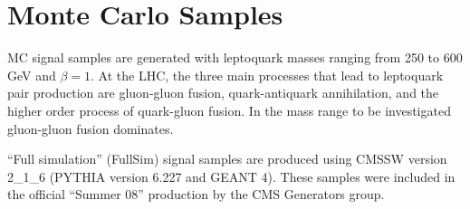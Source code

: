 
%

\section{Monte Carlo Samples} \label{sec:MCSamples}



MC signal samples are generated with leptoquark masses ranging from 250 to 600 GeV and $\beta=1$. 
At the LHC, the three main processes that lead to leptoquark pair production are gluon-gluon fusion, 
quark-antiquark annihilation, and the higher order process of quark-gluon fusion.
In the mass range to be investigated gluon-gluon fusion dominates. 

``Full simulation'' (FullSim) signal samples are produced using 
CMSSW version 2\_1\_6 (PYTHIA version 6.227 and GEANT 4). 
These samples were included in the official ``Summer 08'' production by the CMS Generators group.

